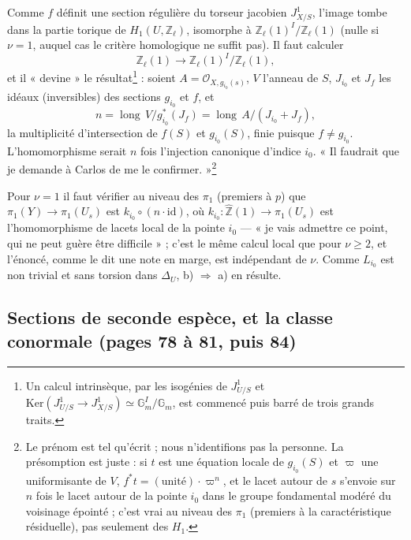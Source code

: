 \documentclass[11pt,a4paper]{article}
\begin{document}
Comme $f$ définit une section régulière du torseur jacobien $J^1_{X/S}$,
l'image tombe dans la partie torique de $H_1(U, \mathbb{Z}_\ell)$, isomorphe à
$\mathbb{Z}_\ell(1)^I/\mathbb{Z}_\ell(1)$ (nulle si $\nu = 1$, auquel cas le
critère homologique ne suffit pas). Il faut calculer
\[
\mathbb{Z}_\ell(1) \longrightarrow \mathbb{Z}_\ell(1)^I/\mathbb{Z}_\ell(1),
\]
et il « devine » le résultat\footnote{Un calcul intrinsèque, par les isogénies
de $J^1_{U/S}$ et $\mathrm{Ker}(J^1_{U/S} \to J^1_{X/S}) \simeq
\mathbb{G}_m^I/\mathbb{G}_m$, est commencé puis barré de trois grands
traits.} : soient $A = \mathcal{O}_{X, g_{i_0}(s)}$, $V$ l'anneau de $S$,
$J_{i_0}$ et $J_f$ les idéaux (inversibles) des sections $g_{i_0}$ et $f$, et
\[
n = \operatorname{long}\, V/g_{i_0}^{*}(J_f) = \operatorname{long}\,
A/(J_{i_0} + J_f),
\]
la multiplicité d'intersection de $f(S)$ et $g_{i_0}(S)$, finie puisque $f \ne
g_{i_0}$. L'homomorphisme serait $n$ fois l'injection canonique d'indice
$i_0$. « Il faudrait que je demande à Carlos de me le confirmer. »\footnote{Le
prénom est tel qu'écrit ; nous n'identifions pas la personne. La présomption
est juste : si $t$ est une équation locale de $g_{i_0}(S)$ et $\varpi$ une
uniformisante de $V$, $f^{*}t = (\text{unité}) \cdot \varpi^{n}$, et le lacet
autour de $s$ s'envoie sur $n$ fois le lacet autour de la pointe $i_0$ dans
le groupe fondamental modéré du voisinage épointé ; c'est vrai au niveau des
$\pi_1$ (premiers à la caractéristique résiduelle), pas seulement des $H_1$.}

Pour $\nu = 1$ il faut vérifier au niveau des $\pi_1$ (premiers à $p$) que
$\pi_1(Y) \to \pi_1(U_s)$ est $k_{i_0} \circ (n \cdot \mathrm{id})$, où $k_{i_0}
: \widehat{\mathbb{Z}}(1) \to \pi_1(U_s)$ est l'homomorphisme de lacets local
de la pointe $i_0$ — « je vais admettre ce point, qui ne peut guère être
difficile » ; c'est le même calcul local que pour $\nu \ge 2$, et l'énoncé, comme
le dit une note en marge, est indépendant de $\nu$. Comme $L_{i_0}$ est non
trivial et sans torsion dans $\Delta_U$, b) $\Rightarrow$ a) en
résulte.

\subsection*{Sections de seconde espèce, et la classe conormale (pages 78 à 81, puis 84)}
\end{document}
